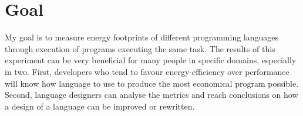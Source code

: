 \section{Goal}
\label{sec:Goal}
    My goal is to measure energy footprints of different programming languages through execution of programs executing the same task. The results of this experiment can be very beneficial for many people in specific domains, especially in two. First, developers who tend to favour energy-efficiency over performance will know how language to use to produce the most economical program possible. Second, language designers can analyse the metrics and reach conclusions on how a design of a language can be improved or rewritten.